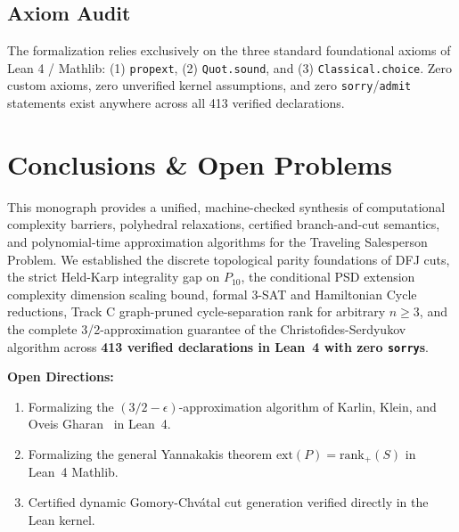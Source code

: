 \documentclass[11pt,a4paper]{article}
\renewcommand{\_}{\origunderscore\allowbreak}
\theoremstyle{plain}
\theoremstyle{definition}
\theoremstyle{remark}
\begin{document}
\subsection{Axiom Audit}
The formalization relies exclusively on the three standard foundational axioms of Lean 4 / Mathlib:
(1) \texttt{propext}, (2) \texttt{Quot.sound}, and (3) \texttt{Classical.choice}.
Zero custom axioms, zero unverified kernel assumptions, and zero \texttt{sorry}/\texttt{admit} statements exist anywhere across all 413 verified declarations.

\section{Conclusions \& Open Problems}

This monograph provides a unified, machine-checked synthesis of computational complexity barriers, polyhedral relaxations, certified branch-and-cut semantics, and polynomial-time approximation algorithms for the Traveling Salesperson Problem. We established the discrete topological parity foundations of DFJ cuts, the strict Held-Karp integrality gap on $P_{10}$, the conditional PSD extension complexity dimension scaling bound, formal 3-SAT and Hamiltonian Cycle reductions, Track C graph-pruned cycle-separation rank for arbitrary $n \ge 3$, and the complete 3/2-approximation guarantee of the Christofides-Serdyukov algorithm across \textbf{413 verified declarations in Lean~4 with zero \texttt{sorry}s}.

\textbf{Open Directions:}
\begin{enumerate}
  \item Formalizing the $(3/2 - \epsilon)$-approximation algorithm of Karlin, Klein, and Oveis Gharan~\cite{karlin2021} in Lean~4.
  \item Formalizing the general Yannakakis theorem $\text{ext}(P) = \text{rank}_+(S)$ in Lean~4 Mathlib.
  \item Certified dynamic Gomory-Chv\'atal cut generation verified directly in the Lean kernel.
\end{enumerate}
\end{document}
